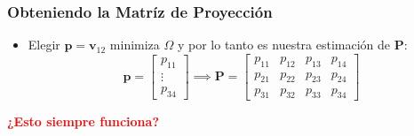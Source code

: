 \begin{frame}
    \frametitle{Obteniendo la Matríz de Proyección}
    \begin{itemize}
        \item Elegir $\mathbf{p} = \mathbf{v}_{12}$ minimiza $\Omega$ y por lo tanto es nuestra estimación de $\mathbf{P}$:
        \begin{equation*}
            \mathbf{p} = \begin{bmatrix}
            p_{11} \\
            \vdots \\
            p_{34}
            \end{bmatrix}
            \implies
            \mathbf{P} = \begin{bmatrix}
            p_{11} & p_{12} & p_{13} & p_{14} \\
            p_{21} & p_{22} & p_{23} & p_{24} \\
            p_{31} & p_{32} & p_{33} & p_{34}
            \end{bmatrix}
        \end{equation*}
    \end{itemize}
    \vspace{1cm}
    \centering
    \textcolor{red}{\bfseries ¿Esto siempre funciona?}
\end{frame}

